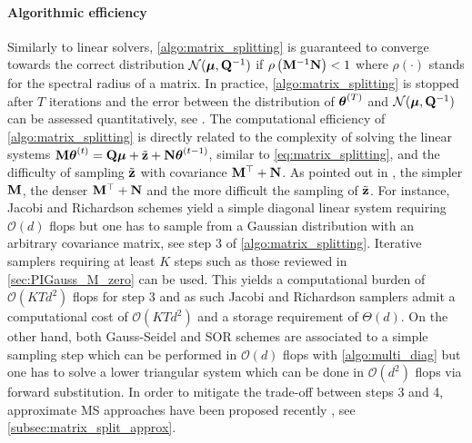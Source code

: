 \documentclass[nohypdvips,onefignum,onetabnum]{siamart171218}
\begin{document}
\paragraph{Algorithmic efficiency}
Similarly to linear solvers, \cref{algo:matrix_splitting} is guaranteed to converge towards the correct distribution $\mathcal{N}(\boldsymbol{\mu},\mathbf{Q}^{-1})$ if $\rho\left(\mathbf{M}^{-1}\mathbf{N}\right) < 1$ where $\rho(\cdot)$ stands for the spectral radius of a matrix.
In practice, \cref{algo:matrix_splitting} is stopped after $T$ iterations and the error between the distribution of $\boldsymbol{\theta}^{(T)}$ and $\mathcal{N}(\boldsymbol{\mu},\mathbf{Q}^{-1})$ can be assessed quantitatively, see \cite{Fox2017}.
The computational efficiency of \cref{algo:matrix_splitting} is directly related to the complexity of solving the linear systems $\mathbf{M}\boldsymbol{\theta}^{(t)} = \mathbf{Q}\boldsymbol{\mu} +  \tilde{\mathbf{z}}+\mathbf{N}\boldsymbol{\theta}^{(t-1)}$, similar to \eqref{eq:matrix_splitting}, and the difficulty of sampling $\tilde{\mathbf{z}}$ with covariance $\mathbf{M}^{\top}+\mathbf{N}$.   
As pointed out in \cite{Fox2017}, the simpler $\mathbf{M}$, the denser $\mathbf{M}^{\top} + \mathbf{N}$ and the more difficult the sampling of $\tilde{\mathbf{z}}$.
For instance, Jacobi and Richardson schemes yield a simple diagonal linear system requiring $\mathcal{O}(d)$ flops but one has to sample from a Gaussian distribution with an arbitrary covariance matrix, see step 3 of \cref{algo:matrix_splitting}.
Iterative samplers requiring at least $K$ steps such as those reviewed in \cref{sec:PIGauss_M_zero} can be used.
This yields a computational burden of $\mathcal{O}(KTd^2)$ flops for step 3 and as such Jacobi and Richardson samplers admit a computational cost of $\mathcal{O}(KTd^2)$ and a storage requirement of $\Theta(d)$.
On the other hand, both Gauss-Seidel and SOR schemes are associated to a simple sampling step which can be performed in $\mathcal{O}(d)$ flops with \cref{algo:multi_diag} but one has to solve a lower triangular system which can be done in $\mathcal{O}(d^2)$ flops via forward substitution.
In order to mitigate the trade-off between steps 3 and 4, approximate MS approaches have been proposed recently \cite{Barbos2017,Johnson2013}, see \cref{subsec:matrix_split_approx}.
\end{document}
